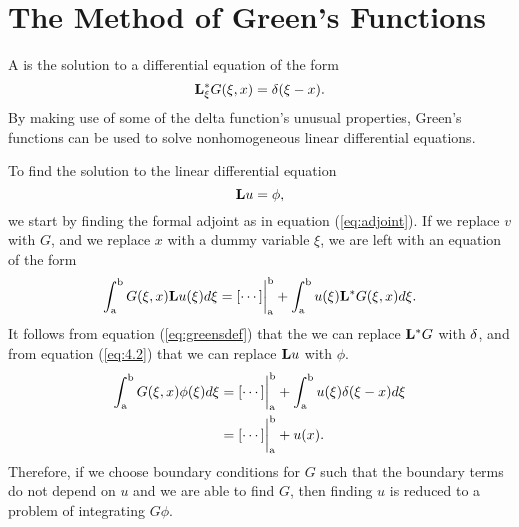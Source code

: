 \section{The Method of Green's Functions}
\setcounter{example}{0}
A  is the solution to a differential equation of the form
\begin{equation} \label{eq:greensdef}
    \mathrm{\bf{L^*_\xi}} G(\xi, x) = \delta(\xi - x).
\end{equation}
By making use of some of the delta function's unusual properties, Green's functions can be used to solve nonhomogeneous linear differential equations.

To find the solution to the linear differential equation
\begin{equation} \label{eq:4.2}
    \mathrm{\bf{L}}u=\phi,
\end{equation}
we start by finding the formal adjoint as in equation (\ref{eq:adjoint}). If we replace \(v\) with \(G\), and we replace \(x\) with a dummy variable \(\xi\), we are left with an equation of the form
\begin{equation} \label{eq:greenadjoint}
    \int_\mathrm{a}^\mathrm{b} G(\xi, x)\mathrm{\bf{L}}u(\xi) d\xi = [\cdots]\biggr\rvert_\mathrm{a}^\mathrm{b} + \int_\mathrm{a}^\mathrm{b} u(\xi)\mathrm{\bf{L^*}}G(\xi,x) d\xi.
\end{equation} 
It follows from equation (\ref{eq:greensdef}) that the we can replace \(\mathrm{\bf{L^*}}G\) with \(\delta\), and from equation (\ref{eq:4.2}) that we can replace \(\mathrm{\bf{L}}u\) with \(\phi\). 
\begin{equation}
    \begin{split}
        \int_\mathrm{a}^\mathrm{b} G(\xi,x)\phi(\xi) d\xi &= [\cdots]\biggr\rvert_\mathrm{a}^\mathrm{b} + \int_\mathrm{a}^\mathrm{b} u(\xi)\delta(\xi-x) d\xi\\
        &=[\cdots]\biggr\rvert_\mathrm{a}^\mathrm{b} + u(x).
    \end{split}
\end{equation}
Therefore, if we choose boundary conditions for \(G\) such that the boundary terms do not depend on \(u\) and we are able to find \(G\), then finding \(u\) is reduced to a problem of integrating \(G\phi\). 

